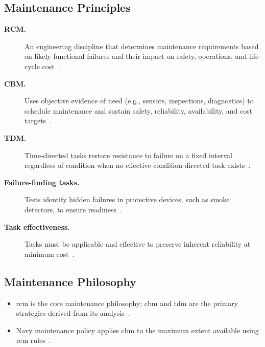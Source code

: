 \documentclass[../main.tex]{subfiles}
\begin{document}
\subsection{Maintenance Principles}
\begin{description}
  \item[\textbf{RCM.}] An engineering discipline that determines maintenance requirements based on likely functional failures and their impact on safety, operations, and life-cycle cost~\autocite{OPNAVINST4700-7N,edo-4-1-3-fleet-maint-policy-2025}.
  \item[\textbf{CBM.}] Uses objective evidence of need (e.g., sensors, inspections, diagnostics) to schedule maintenance and sustain safety, reliability, availability, and cost targets~\autocite{OPNAVINST4700-7N,edo-4-1-3-fleet-maint-policy-2025}.
  \item[\textbf{TDM.}] Time-directed tasks restore resistance to failure on a fixed interval regardless of condition when no effective condition-directed task exists~\autocite{OPNAVINST4700-7N,edo-4-1-3-fleet-maint-policy-2025}.
  \item[\textbf{Failure-finding tasks.}] Tests identify hidden failures in protective devices, such as smoke detectors, to ensure readiness~\autocite{edo-4-1-3-fleet-maint-policy-2025}.
  \item[\textbf{Task effectiveness.}] Tasks must be applicable and effective to preserve inherent reliability at minimum cost~\autocite{edo-4-1-3-fleet-maint-policy-2025}.
\end{description}

\subsection{Maintenance Philosophy}
\begin{itemize}
  \item \ac{rcm} is the core maintenance philosophy; \ac{cbm} and \ac{tdm} are the primary strategies derived from its analysis~\autocite{OPNAVINST4700-7N,edo-4-1-3-fleet-maint-policy-2025}.
  \item Navy maintenance policy applies \ac{cbm} to the maximum extent available using \ac{rcm} rules~\autocite{OPNAVINST4700-7N,edo-4-1-3-fleet-maint-policy-2025}.
\end{itemize}
\end{document}

